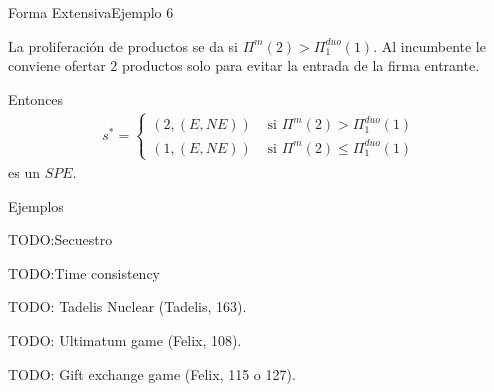 \documentclass[notes, 11pt]{beamer} %
\newenvironment{wideitemize}{\itemize\addtolength{\itemsep}{10pt}}{\enditemize}
\begin{document}
\begin{frame}{Forma Extensiva}{Ejemplo 6}
\begin{wideitemize}
	\item<1-> La proliferaci\'on de productos se da si $\Pi^{m}(2) > \Pi^{duo}_{1}(1)$. Al incumbente le conviene ofertar $2$ productos solo para evitar la entrada de la firma entrante.
	\item<2-> Entonces 
	\begin{align*}
		s^{*} = \begin{cases}
			(2,(E,NE)) &\text{ si } \Pi^{m}(2) > \Pi^{duo}_{1}(1) \\
			(1,(E,NE)) &\text{ si } \Pi^{m}(2) \leq \Pi^{duo}_{1}(1)
		\end{cases}
	\end{align*} es un $SPE$.
\end{wideitemize}
\end{frame}
\fi

\begin{frame}{Ejemplos}
	\begin{wideitemize}
		\item<1-> TODO:Secuestro
		\item<2-> TODO:Time consistency
		\item<3-> TODO: Tadelis Nuclear (Tadelis, 163).
		\item<4-> TODO: Ultimatum game (Felix, 108).
		\item<5-> TODO: Gift exchange game (Felix, 115 o 127).
	\end{wideitemize}
\end{frame}

\begin{frame}
\maketitle
\end{frame}
\end{document}

